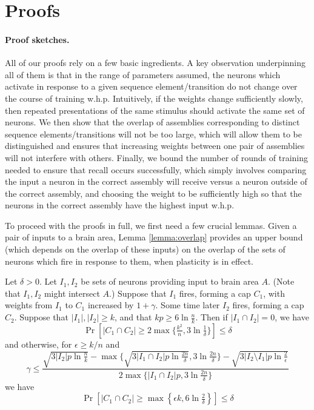 \documentclass[12pt,nosubfloats]{alt2024} %
\newcommand{\1}{\mathbbm{1}}
\begin{document}
\section{Proofs}\label{sec: proofs}

\paragraph{Proof sketches.}
All of our proofs rely on a few basic ingredients. A key observation underpinning all of them is that in the range of parameters assumed, the neurons which activate in response to a given sequence element/transition do not change over the course of training w.h.p. Intuitively, if the weights change sufficiently slowly, then repeated presentations of the same stimulus should activate the same set of neurons. We then show that the overlap of assemblies corresponding to distinct sequence elements/transitions will not be too large, which will allow them to be distinguished and ensures that increasing weights between one pair of assemblies will not interfere with others. Finally, we bound the number of rounds of training needed to ensure that recall occurs successfully, which simply involves comparing the input a neuron in the correct assembly will receive versus a neuron outside of the correct assembly, and choosing the weight to be sufficiently high so that the neurons in the correct assembly have the highest input w.h.p.

To proceed with the proofs in full, we first need a few crucial lemmas. Given a pair of inputs to a brain area, Lemma \ref{lemma:overlap} provides an upper bound (which depends on the overlap of these inputs) on the overlap of the sets of neurons which fire in response to them, when plasticity is in effect.

\begin{lemma} \label{lemma:overlap}
Let $\delta > 0$. Let $I_1, I_2$ be sets of neurons providing input to brain area $A$. (Note that $I_1, I_2$ might intersect $A$.) Suppose that $I_1$ fires, forming a cap $C_1$, with weights from $I_1$ to $C_1$ increased by $1 + \gamma$.
Some time later $I_2$ fires, forming a cap $C_2$. Suppose that $|I_1|, |I_2| \ge k$, and that $kp \ge 6\ln \frac{n}{k}$. Then if $|I_1 \cap I_2| = 0$, we have
\[\Pr\left[|C_1 \cap C_2| \ge 2 \max \{\tfrac{k^2}{n}, 3\ln \tfrac{1}{\delta}\}\right] \le \delta\]
and otherwise, for $\epsilon \ge k / n$ and
\[\gamma \le \frac{\sqrt{3|I_2|p\ln \frac{n}{k}} - \max \{\sqrt{3|I_1 \cap I_2|p\ln \frac{2n}{\delta}}, 3\ln \frac{2n}{\delta}\} - \sqrt{3|I_2 \setminus I_1|p\ln \frac{2}{\epsilon}}}{2\max \{|I_1 \cap I_2|p, 3\ln \frac{2n}{\delta}\}}\]
we have 
\[\Pr\left[|C_1 \cap C_2| \ge \max \left\{\epsilon k, 6\ln \tfrac{2}{\delta}\right\}\right] \le \delta\]
\end{lemma}
\end{document}
